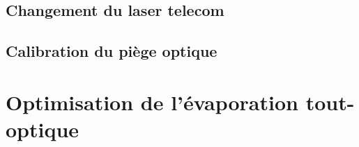 \subsection{Changement du laser telecom}
\subsection{Calibration du piège optique}

\section{Optimisation de l'évaporation tout-optique}
\label{sc:evap_optique}

